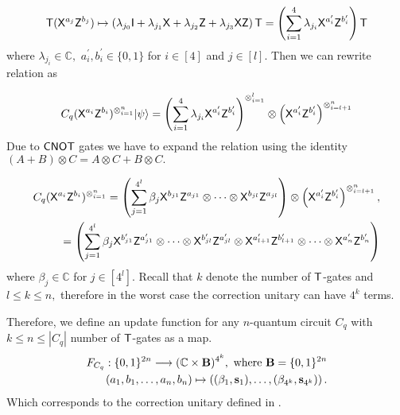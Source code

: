 \begin{equation}
\begin{aligned}
\label{nqubit:eq7}
{\sf T}({\sf X}^{a_{j}}{\sf Z}^{b_{j}})\mapsto \left(\lambda_{j_0} {\sf I} + \lambda_{j_1} {\sf X} + \lambda_{j_2} {\sf Z} + \lambda_{j_3} {\sf X} {\sf Z} \right){\sf T}=\left(\sum_{i=1}^4 \lambda_{j_i} {\sf X}^{a_{i}^\prime}{\sf Z}^{b_{i}^\prime}\right){\sf T}\\
 \end{aligned}
\end{equation}
where $\lambda_{j_i}\in\mathbb{C}, $  $a_{i}^\prime, b_{i}^\prime \in\{0,1\}$ for $i\in[4]$ and $j\in[l].$ Then we can rewrite relation  as


\begin{equation}
\label{nqubit:eq8}
\begin{aligned}
 C_q ({\sf X}^{a_{i}}{\sf Z}^{b_{i}})^{\otimes_{i=1}^{n}}{\lvert}\psi\rangle= \left(\sum_{i=1}^4 \lambda_{j_i} {\sf X}^{a_{i}^\prime}{\sf Z}^{b_{i}^\prime}\right)^{\otimes_{i=1}^{l}} \otimes \left({\sf X}^{a_{i}^\prime}{\sf Z}^{b_{i}^\prime}\right)^{\otimes_{i=l+1}^{n}}\\
\end{aligned}
\end{equation}
Due to ${\sf CNOT}$ gates we have to expand the relation   using the identity $(A+B)\otimes C=A\otimes C + B\otimes C.$


\begin{equation}
\label{nqubit:eq9}
\begin{aligned}
C_q ({\sf X}^{a_{i}}{\sf Z}^{b_{i}})^{\otimes_{i=1}^{n}}=\left(\sum_{j=1}^{4^l} \beta_j {\sf X}^{b_{j1}}{\sf Z}^{a_{j1}} \otimes \cdots \otimes{\sf X}^{b_{jl}}{\sf Z}^{a_{jl}}\right) \otimes \left({\sf X}^{a_{i}^\prime}{\sf Z}^{b_{i}^\prime}\right)^{\otimes_{i=l+1}^{n}}, \\
 =\left(\sum_{j=1}^{4^{l}} \beta_j {\sf X}^{b_{j1}^\prime}{\sf Z}^{a_{j1}^\prime} \otimes \cdots \otimes{\sf X}^{b_{jl}^\prime}{\sf Z}^{a_{jl}^\prime} \otimes {\sf X}^{a_{l+1}^\prime}{\sf Z}^{b_{l+1}^\prime}  \otimes \cdots   \otimes{\sf X}^{a_{n}^\prime}{\sf Z}^{b_{n}^\prime}\right)
 \end{aligned}
\end{equation}
where $\beta_j\in \mathbb{C}$ for $j\in[4^l].$  Recall that $k$ denote the number of ${\sf T}$-gates and $l\leq k\leq n,$ therefore in the worst case the correction unitary can have $4^k$ terms.



Therefore, we define an update function for any $n$-quantum circuit $C_q$ with $k\leq n\leq |C_q|$ number of ${\sf T}$-gates as a map.
\begin{equation}
\label{nqubit:eq10}
\begin{aligned}
 F_{C_q}:\{0,1\}^{2n}\longrightarrow  (\mathbb{C} \times {\bf B})^{4^k}, \mbox{ where } {\bf B}=\{0,1\}^{2n}\\
  (a_1,b_1,\ldots, a_n,b_n) \mapsto \left((\beta_1, {\bf s}_1),\dots, (\beta_{4^k}, {\bf s}_{4^k})\right).
\end{aligned}
\end{equation}
Which corresponds to the correction unitary defined in .
